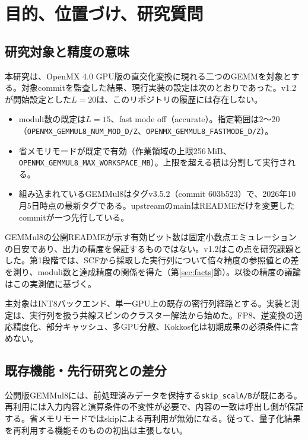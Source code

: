 \documentclass[a4paper,11pt]{ltjsarticle}
\newcommand{\code}[1]{\texttt{#1}}
\begin{document}

\section{目的、位置づけ、研究質問}
\subsection{研究対象と精度の意味}
本研究は、OpenMX 4.0 GPU版\cite{openmxgpu}の直交化変換に現れる二つのGEMMを対象とする。対象commitを監査した結果、現行実装の設定は次のとおりであった。v1.2が開始設定とした$L=20$は、このリポジトリの履歴には存在しない。
\begin{itemize}
\item moduli数の既定は$L=15$、fast mode off（accurate）。指定範囲は2〜20（\code{OPENMX\_GEMMUL8\_NUM\_MOD\_D/Z}、\code{OPENMX\_GEMMUL8\_FASTMODE\_D/Z}）。
\item 省メモリモードが既定で有効（作業領域の上限256\,MiB、\code{OPENMX\_GEMMUL8\_MAX\_WORKSPACE\_MB}）。上限を超える積は分割して実行される。
\item 組み込まれているGEMMul8はタグv3.5.2（commit 603b523）で、2026年10月5日時点の最新タグである。upstreamのmainはREADMEだけを変更したcommitが一つ先行している。
\end{itemize}

GEMMul8の公開READMEが示す有効ビット数は固定小数点エミュレーションの目安であり、出力の精度を保証するものではない\cite{gemmul8,ozaki}。v1.2はこの点を研究課題とした。第1段階では、SCFから採取した実行列について倍々精度の参照値との差を測り、moduli数と達成精度の関係を得た（第\ref{sec:facts}節）。以後の精度の議論はこの実測値に基づく。

主対象はINT8バックエンド、単一GPU上の既存の密行列経路とする。実装と測定は、実行列を扱う共線スピンのクラスター解法から始めた。FP8、逆変換の適応精度化、部分キャッシュ、多GPU分散、Kokkos化は初期成果の必須条件に含めない。

\subsection{既存機能・先行研究との差分}
公開版GEMMul8には、前処理済みデータを保持する\code{skip\_scalA/B}が既にある。再利用には入力内容と演算条件の不変性が必要で、内容の一致は呼出し側が保証する。省メモリモードではskipによる再利用が無効になる\cite{gemmul8}。従って、量子化結果を再利用する機能そのものの初出は主張しない。
\end{document}
